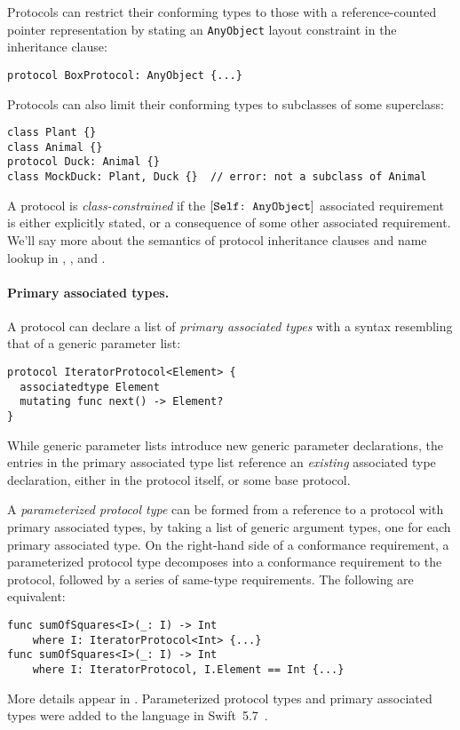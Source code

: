 \documentclass[../generics]{subfiles}
\begin{document}
Protocols can restrict their conforming types to those with a reference-counted pointer representation by stating an \texttt{AnyObject} layout constraint in the inheritance clause:
\begin{Verbatim}
protocol BoxProtocol: AnyObject {...}
\end{Verbatim}

Protocols can also limit their conforming types to subclasses of some superclass:
\begin{Verbatim}
class Plant {}
class Animal {}
protocol Duck: Animal {}
class MockDuck: Plant, Duck {}  // error: not a subclass of Animal
\end{Verbatim}
A protocol is \emph{class-constrained} if the $[\texttt{Self:~AnyObject}]$ associated requirement is either explicitly stated, or a consequence of some other associated requirement. We'll say more about the semantics of protocol inheritance clauses and name lookup in , , and .

\paragraph{Primary associated types.}
A protocol can declare a list of \emph{primary associated types} with a syntax resembling that of a generic parameter list:
\begin{Verbatim}
protocol IteratorProtocol<Element> {
  associatedtype Element
  mutating func next() -> Element?
}
\end{Verbatim}
While generic parameter lists introduce new generic parameter declarations, the entries in the primary associated type list reference an \emph{existing} associated type declaration, either in the protocol itself, or some base protocol.

A \emph{parameterized protocol type} can be formed from a reference to a protocol with primary associated types, by taking a list of generic argument types, one for each primary associated type. On the right-hand side of a conformance requirement, a parameterized protocol type decomposes into a conformance requirement to the protocol, followed by a series of same-type requirements. The following are equivalent:
\begin{Verbatim}
func sumOfSquares<I>(_: I) -> Int
    where I: IteratorProtocol<Int> {...}
func sumOfSquares<I>(_: I) -> Int
    where I: IteratorProtocol, I.Element == Int {...}
\end{Verbatim}
More details appear in . Parameterized protocol types and primary associated types were added to the language in Swift~5.7~\cite{se0346}. 
\end{document}
